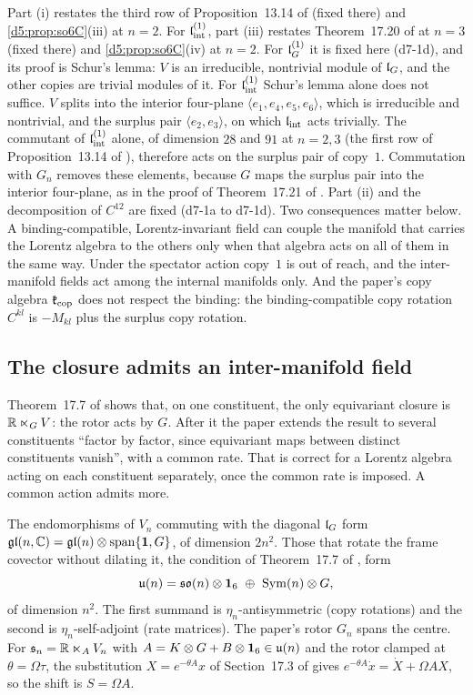 Part (i) restates the third row of Proposition~13.14 of \cite{ES17} (fixed there) and \cref{d5:prop:so6C}(iii) at $n=2$. For $\mathfrak l_{\rm int}^{(1)}$, part (iii) restates
Theorem~17.20 of \cite{ES17} at $n=3$ (fixed there) and \cref{d5:prop:so6C}(iv) at $n=2$. For $\mathfrak l_G^{(1)}$ it is fixed here (d7-1d), and its proof is Schur's lemma: $V$ is an irreducible,
nontrivial module of $\mathfrak l_G$, and the other copies are trivial modules of it. For $\mathfrak l_{\rm int}^{(1)}$ Schur's lemma alone does not suffice. $V$ splits into the interior four-plane
$\langle e_1,e_4,e_5,e_6\rangle$, which is irreducible and nontrivial, and the surplus pair $\langle e_2,e_3\rangle$, on which $\mathfrak l_{\rm int}$ acts trivially. The commutant of $\mathfrak l_{\rm int}^{(1)}$ alone, of
dimension $28$ and $91$ at $n=2,3$ (the first row of Proposition~13.14 of \cite{ES17}), therefore acts on the surplus pair of copy~$1$. Commutation with $G_n$ removes
these elements, because $G$ maps the surplus pair into the interior four-plane, as in the proof of Theorem~17.21 of \cite{ES17}. Part (ii) and the decomposition of
$C^{12}$ are fixed (d7-1a to d7-1d). Two consequences matter below. A binding-compatible, Lorentz-invariant field can couple the manifold that
carries the Lorentz algebra to the others only when that algebra acts on all of them in the same way. Under the spectator action copy~$1$ is out
of reach, and the inter-manifold fields act among the internal manifolds only. And the paper's copy algebra $\mathfrak k_{\rm cop}$ does not respect
the binding: the binding-compatible copy rotation $C^{kl}$ is $-M_{kl}$ plus the surplus copy rotation.

\subsection{The closure admits an inter-manifold field}
\label{d7:sec:rotor}

Theorem~17.7 of \cite{ES17} shows that, on one constituent, the only equivariant closure is $\mathbb{R}\ltimes_GV$: the rotor acts by $G$. After it the
paper extends the result to several constituents ``factor by factor, since equivariant maps between distinct constituents vanish'', with a common
rate. That is correct for a Lorentz algebra acting on each constituent separately, once the common rate is imposed. A common action admits more.

\begin{proposition}
\label{d7:prop:rotor}
The endomorphisms of $V_n$ commuting with the diagonal $\mathfrak l_G$ form $\mathfrak{gl}(n,\mathbb{C})=\mathfrak{gl}(n)\otimes\operatorname{span}\{\mathbf 1,G\}$, of dimension
$2n^2$. Those that rotate the frame covector without dilating it, the condition of Theorem~17.7 of \cite{ES17}, form
\[
\uu n=\so n\otimes\id_6\ \oplus\ \operatorname{Sym}(n)\otimes G ,
\]
of dimension $n^2$. The first summand is $\eta_n$-antisymmetric (copy rotations) and the second is $\eta_n$-self-adjoint (rate matrices). The paper's
rotor $G_n$ spans the centre. For $\mathfrak s_n=\mathbb{R}\ltimes_AV_n$ with $A=K\otimes G+B\otimes\mathbf 1_6\in\mathfrak{u}(n)$ and the rotor clamped at $\theta=\Omega\tau$, the
substitution $X=e^{-\theta A}x$ of Section~17.3 of \cite{ES17} gives $e^{-\theta A}\dot x=\dot X+\Omega AX$, so the shift is $S=\Omega A$.
\end{proposition}

